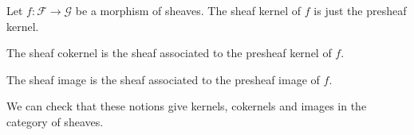 Let $f\colon \mathcal{F}\to \mathcal{G}$ be a morphism of sheaves. The sheaf kernel of $f$
is just the presheaf kernel.

The sheaf cokernel is the sheaf associated to the presheaf kernel of $f$.

The sheaf image is the sheaf associated to the presheaf image of $f$.

We can check that these notions give kernels, cokernels and images in the category
of sheaves.

